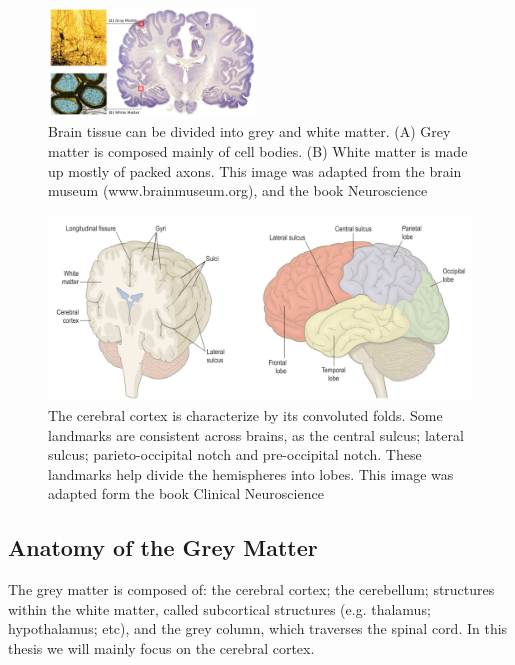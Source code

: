 \begin{figure}[t]
    \includegraphics[width=0.49\textwidth]{2.neuroanatomy/img/white_vs_gray.png}
    \caption{Brain tissue can be divided into grey and white matter. (A) Grey matter
             is composed mainly of cell bodies. (B) White matter is made up mostly
             of packed axons. This image was adapted from the brain museum (www.brainmuseum.org),
             and the book Neuroscience\cite{Purves2004}}
    \label{fig:white_grey_matter}
\end{figure}

\begin{figure}[t]
    \includegraphics[width=\textwidth]{2.neuroanatomy/img/lobes.png}
    \caption{The cerebral cortex is characterize by its convoluted folds.
             Some landmarks are consistent across brains, as the central sulcus;
             lateral sulcus; parieto-occipital notch and pre-occipital notch.
             These landmarks help divide the hemispheres into lobes. This image
             was adapted form the book Clinical Neuroscience\cite{Johns}}
    \label{fig:cortex_anatomy}
\end{figure}

\subsection{Anatomy of the Grey Matter}

The grey matter is composed of: the cerebral cortex; the cerebellum; structures
within the white matter, called subcortical structures (e.g. thalamus; hypothalamus; etc),
and the grey column, which traverses the spinal cord. In this thesis we will
mainly focus on the cerebral cortex.

